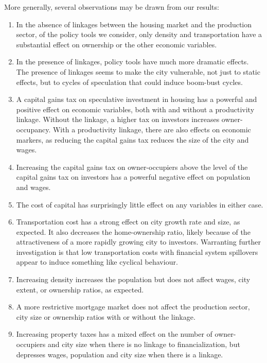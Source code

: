 More generally, several observations may be drawn from our results: 
\begin{enumerate}
\item In the absence of linkages between the housing market and the production sector, of the policy tools we consider, only density and transportation have a substantial effect on ownership or the other economic variables. %

\item In the presence of linkages, policy tools have much more dramatic effects. %
The presence of linkages seems to make the city vulnerable, not just to static effects, but to cycles of speculation that could induce boom-bust cycles. 


\item A capital gains tax on speculative investment in housing has a powerful and positive effect on economic variables, both with and without a productivity linkage. Without the linkage, a higher tax on investors increases owner-occupancy. With a productivity linkage, there are also effects on economic markers, as reducing the capital gains tax reduces the size of the city and wages. 

\item Increasing the capital gains tax on owner-occupiers above the level of the capital gains tax on investors has a powerful negative effect on population and wages.

\item The cost of capital has surprisingly little effect on any variables in either case.

\item Transportation cost has a strong effect on city growth rate and size, as expected. It also decreases the home-ownership ratio, likely because of the attractiveness of a more rapidly growing city to investors. Warranting further investigation is that low transportation costs with financial system spillovers appear to induce something like cyclical behaviour.

\item Increasing density increases the population but does not affect wages, city extent, or ownership ratios, as expected.

\item A more restrictive mortgage market does not affect the production sector, city size or ownership ratios with or without the linkage.

\item Increasing property taxes has a mixed effect on the number of owner-occupiers and city size when there is no linkage to financialization, but depresses wages, population and city size when there is a linkage. 
\end{enumerate}
